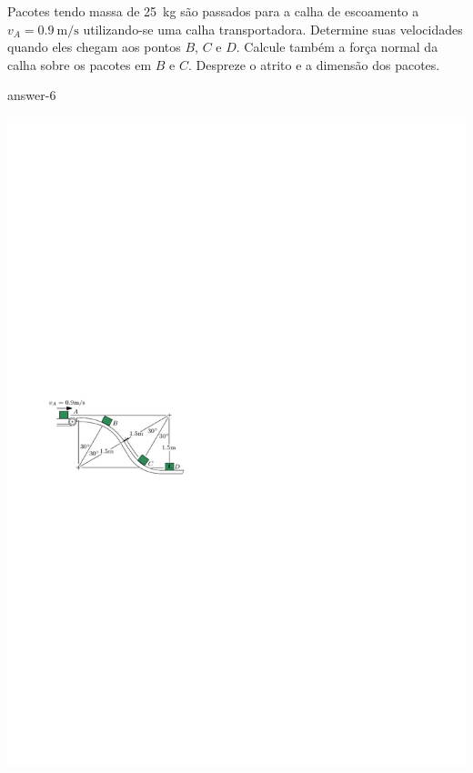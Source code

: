 
\item Pacotes tendo massa de \SI{25}{\kilogram} são passados para a calha de escoamento a $v_{A}=\SI{0.9}{\meter/\second}$ utilizando-se uma calha transportadora. Determine suas velocidades quando eles chegam aos pontos $B$, $C$ e $D$. Calcule também a força normal da calha sobre os pacotes em $B$ e $C$. Despreze o atrito e a dimensão dos pacotes.

{answer-6}

\vspace{-3.6cm}
\begin{flushright}
    \includegraphics[scale=1.7]{images/draw_6.pdf}
\end{flushright}